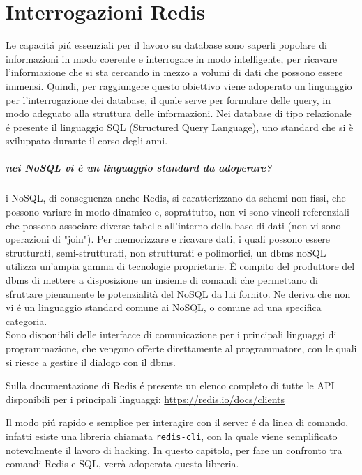 \chapter{Interrogazioni Redis}
Le capacitá piú essenziali per il lavoro su database sono saperli popolare di informazioni in modo coerente e interrogare in modo
intelligente, per ricavare l'informazione che si sta cercando in mezzo a volumi di dati che possono essere immensi.
Quindi, per raggiungere questo obiettivo viene adoperato un linguaggio per l'interrogazione dei database, il quale serve per formulare delle
query, in modo adeguato alla struttura delle informazioni.
Nei database di tipo relazionale é presente il linguaggio SQL (Structured Query Language), uno standard che si è sviluppato
durante il corso degli anni.

\paragraph{nei NoSQL vi é un linguaggio standard da adoperare?\\}
i NoSQL, di conseguenza anche Redis, si caratterizzano da schemi non fissi, che possono variare in modo dinamico e, soprattutto, non vi sono vincoli referenziali che possono associare
diverse tabelle all'interno della base di dati (non vi sono operazioni di "join").
Per memorizzare e ricavare dati, i quali possono essere strutturati, semi-strutturati, non strutturati e polimorfici, un dbms noSQL utilizza un'ampia gamma di
tecnologie proprietarie.
È compito del produttore del dbms di mettere a disposizione un insieme di comandi che permettano di sfruttare pienamente le potenzialità del NoSQL da lui fornito.
Ne deriva che non vi é un linguaggio standard comune ai NoSQL, o comune ad una specifica categoria.\\
Sono disponibili delle interfacce di comunicazione per i principali linguaggi di programmazione, che vengono
offerte direttamente al programmatore, con le quali si riesce a gestire il dialogo con il dbms.

Sulla documentazione di Redis é presente un elenco completo di tutte le API disponibili per i principali linguaggi:
\url{https://redis.io/docs/clients}

Il modo piú rapido e semplice per interagire con il server é da linea di comando, infatti esiste una libreria chiamata
\texttt{redis-cli}, con la quale viene semplificato notevolmente il lavoro di hacking.
In questo capitolo, per fare un confronto tra comandi Redis e SQL, verrà adoperata questa libreria.\\

